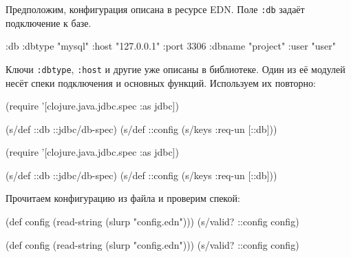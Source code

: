 
Предположим, конфигурация описана в ресурсе EDN. Поле \verb|:db| задаёт
подключение к базе.


\begin{english}
  \begin{clojure}
{:db {:dbtype "mysql"
      :host "127.0.0.1"
      :port 3306
      :dbname "project"
      :user "user"}}
  \end{clojure}
\end{english}

Ключи \verb|:dbtype|, \verb|:host| и другие уже описаны в библиотеке. Один из её
модулей несёт спеки подключения и основных функций. Используем их повторно:

\ifx\DEVICETYPE\MOBILE

\begin{english}
  \begin{clojure}
(require
  '[clojure.java.jdbc.spec :as jdbc])

(s/def ::db ::jdbc/db-spec)
(s/def ::config (s/keys :req-un [::db]))
  \end{clojure}
\end{english}

\else

\begin{english}
  \begin{clojure}
(require '[clojure.java.jdbc.spec :as jdbc])

(s/def ::db ::jdbc/db-spec)
(s/def ::config (s/keys :req-un [::db]))
  \end{clojure}
\end{english}

\fi

\noindent
Прочитаем конфигурацию из файла и проверим спекой:

\ifx\DEVICETYPE\MOBILE

\begin{english}
  \begin{clojure}
(def config
  (read-string (slurp "config.edn")))
(s/valid? ::config config)
  \end{clojure}
\end{english}

\else

\begin{english}
  \begin{clojure}
(def config (read-string (slurp "config.edn")))
(s/valid? ::config config)
  \end{clojure}
\end{english}

